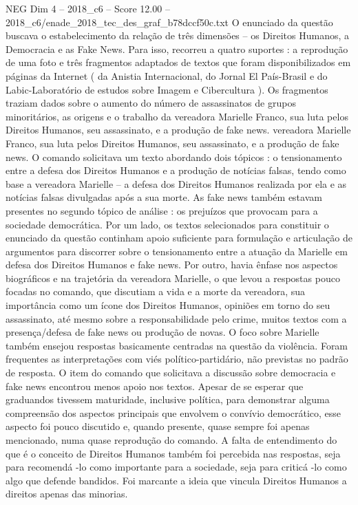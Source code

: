 \begin{textsample}{NEG Dim 4 – 2018\_c6 – Score 12.00 – 2018\_c6/enade\_2018\_tec\_des\_graf\_b78dccf50c.txt}
O enunciado da questão buscava o estabelecimento da relação de três dimensões – os Direitos Humanos, a Democracia e as Fake News.
Para isso, recorreu a quatro suportes : a reprodução de uma foto e três fragmentos adaptados de textos que foram disponibilizados em páginas da Internet ( da Anistia Internacional, do Jornal El País-Brasil e do Labic-Laboratório de estudos sobre Imagem e Cibercultura ).
Os fragmentos traziam dados sobre o aumento do número de assassinatos de grupos minoritários, as origens e o trabalho da vereadora Marielle Franco, sua luta pelos Direitos Humanos, seu assassinato, e a produção de fake news. vereadora Marielle Franco, sua luta pelos Direitos Humanos, seu assassinato, e a produção de fake news.
O comando solicitava um texto abordando dois tópicos : o tensionamento entre a defesa dos Direitos Humanos e a produção de notícias falsas, tendo como base a vereadora Marielle – a defesa dos Direitos Humanos realizada por ela e as notícias falsas divulgadas após a sua morte.
As fake news também estavam presentes no segundo tópico de análise : os prejuízos que provocam para a sociedade democrática.
Por um lado, os textos selecionados para constituir o enunciado da questão continham apoio suficiente para formulação e articulação de argumentos para discorrer sobre o tensionamento entre a atuação da Marielle em defesa dos Direitos Humanos e fake news.
Por outro, havia ênfase nos aspectos biográficos e na trajetória da vereadora Marielle, o que levou a respostas pouco focadas no comando, que discutiam a vida e a morte da vereadora, sua importância como um ícone dos Direitos Humanos, opiniões em torno do seu assassinato, até mesmo sobre a responsabilidade pelo crime, muitos textos com a presença/defesa de fake news ou produção de novas.
O foco sobre Marielle também ensejou respostas basicamente centradas na questão da violência.
Foram frequentes as interpretações com viés político-partidário, não previstas no padrão de resposta.
O item do comando que solicitava a discussão sobre democracia e fake news encontrou menos apoio nos textos.
Apesar de se esperar que graduandos tivessem maturidade, inclusive política, para demonstrar alguma compreensão dos aspectos principais que envolvem o convívio democrático, esse aspecto foi pouco discutido e, quando presente, quase sempre foi apenas mencionado, numa quase reprodução do comando.
A falta de entendimento do que é o conceito de Direitos Humanos também foi percebida nas respostas, seja para recomendá -lo como importante para a sociedade, seja para criticá -lo como algo que defende bandidos.
Foi marcante a ideia que vincula Direitos Humanos a direitos apenas das minorias.

\end{textsample}
